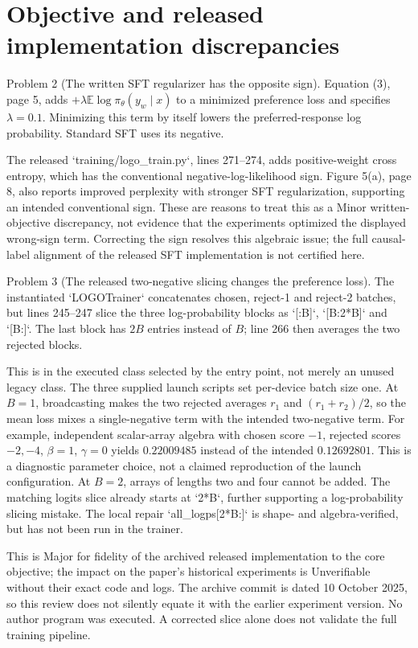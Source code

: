 \documentclass[10pt]{article}
\begin{document}
\section*{Objective and released implementation discrepancies}
Problem 2 (The written SFT regularizer has the opposite sign).  Equation (3), page 5, adds \(+\lambda\mathbb E\log\pi_\theta(y_w\mid x)\) to a minimized preference loss and specifies \(\lambda=0.1\). Minimizing this term by itself lowers the preferred-response log probability. Standard SFT uses its negative.\par
The released `training/logo\_train.py`, lines 271–274, adds positive-weight cross entropy, which has the conventional negative-log-likelihood sign. Figure 5(a), page 8, also reports improved perplexity with stronger SFT regularization, supporting an intended conventional sign. These are reasons to treat this as a Minor written-objective discrepancy, not evidence that the experiments optimized the displayed wrong-sign term. Correcting the sign resolves this algebraic issue; the full causal-label alignment of the released SFT implementation is not certified here.\par
Problem 3 (The released two-negative slicing changes the preference loss).  The instantiated `LOGOTrainer` concatenates chosen, reject-1 and reject-2 batches, but lines 245–247 slice the three log-probability blocks as `[:B]`, `[B:2*B]` and `[B:]`. The last block has \(2B\) entries instead of \(B\); line 266 then averages the two rejected blocks.\par
This is in the executed class selected by the entry point, not merely an unused legacy class. The three supplied launch scripts set per-device batch size one. At \(B=1\), broadcasting makes the two rejected averages \(r_1\) and \((r_1+r_2)/2\), so the mean loss mixes a single-negative term with the intended two-negative term. For example, independent scalar-array algebra with chosen score \(-1\), rejected scores \(-2,-4\), \(\beta=1\), \(\gamma=0\) yields \(0.22009485\) instead of the intended \(0.12692801\). This is a diagnostic parameter choice, not a claimed reproduction of the launch configuration. At \(B=2\), arrays of lengths two and four cannot be added. The matching logits slice already starts at `2*B`, further supporting a log-probability slicing mistake. The local repair `all\_logps[2*B:]` is shape- and algebra-verified, but has not been run in the trainer.\par
This is Major for fidelity of the archived released implementation to the core objective; the impact on the paper’s historical experiments is Unverifiable without their exact code and logs. The archive commit is dated 10 October 2025, so this review does not silently equate it with the earlier experiment version. No author program was executed. A corrected slice alone does not validate the full training pipeline.\par
\end{document}
